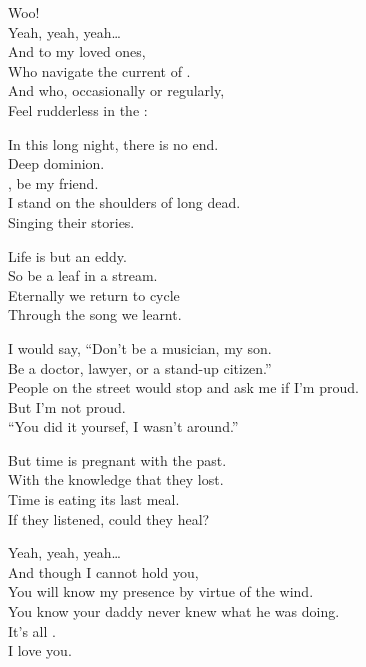 
Woo! \\
Yeah, yeah, yeah… \\
And to my loved ones, \\
Who navigate the current of . \\
And who, occasionally or regularly, \\
Feel rudderless in the : \\


In this long night, there is no end. \\
Deep dominion. \\
, be my friend. \\
I stand on the shoulders of  long dead. \\
Singing their stories. \\


Life is but an eddy. \\
So be a leaf in a stream. \\
Eternally we return to cycle \\
Through the song we learnt. \\


I would say, ``Don't be a musician, my son. \\
Be a doctor, lawyer, or a stand-up citizen.'' \\
People on the street would stop and ask me if I'm proud. \\
But I'm not proud. \\
``You did it yoursef, I wasn't around.'' \\


But time is pregnant with the past. \\
With the knowledge that they lost. \\
Time is eating its last meal. \\
If they listened, could they heal? \\


Yeah, yeah, yeah… \\
And though I cannot hold you, \\
You will know my presence by virtue of the wind. \\
You know your daddy never knew what he was doing. \\
It's all . \\
I love you. \\

